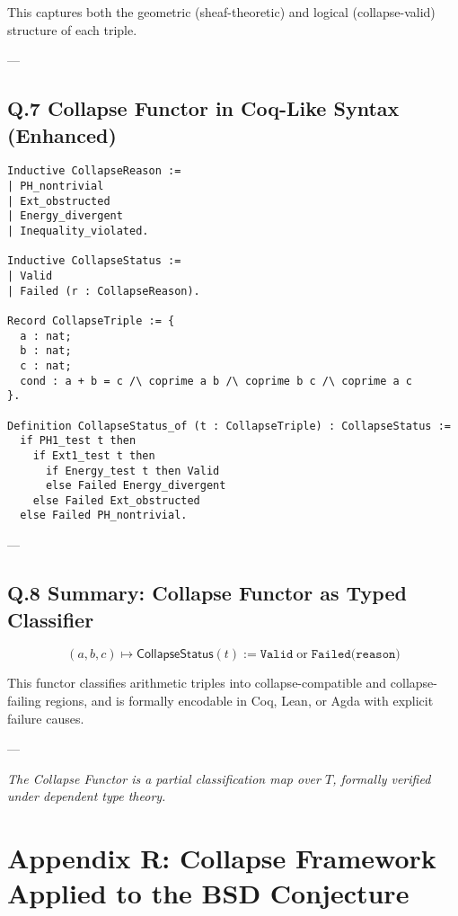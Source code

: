 \documentclass[11pt]{article}
\begin{document}
This captures both the geometric (sheaf-theoretic) and logical (collapse-valid) structure of each triple.

---

\subsection*{Q.7 Collapse Functor in Coq-Like Syntax (Enhanced)}

\begin{verbatim}
Inductive CollapseReason :=
| PH_nontrivial
| Ext_obstructed
| Energy_divergent
| Inequality_violated.

Inductive CollapseStatus :=
| Valid
| Failed (r : CollapseReason).

Record CollapseTriple := {
  a : nat;
  b : nat;
  c : nat;
  cond : a + b = c /\ coprime a b /\ coprime b c /\ coprime a c
}.

Definition CollapseStatus_of (t : CollapseTriple) : CollapseStatus :=
  if PH1_test t then
    if Ext1_test t then
      if Energy_test t then Valid
      else Failed Energy_divergent
    else Failed Ext_obstructed
  else Failed PH_nontrivial.
\end{verbatim}

---

\subsection*{Q.8 Summary: Collapse Functor as Typed Classifier}

\[
\boxed{
(a,b,c) \mapsto \mathsf{CollapseStatus}(t) := \texttt{Valid} \;\text{or}\; \texttt{Failed(reason)}
}
\]

This functor classifies arithmetic triples into collapse-compatible and collapse-failing regions,  
and is formally encodable in Coq, Lean, or Agda with explicit failure causes.

---

\begin{center}
\textit{The Collapse Functor is a partial classification map over \( T \), formally verified under dependent type theory.}
\end{center}



\section*{Appendix R: Collapse Framework Applied to the BSD Conjecture}
\end{document}
